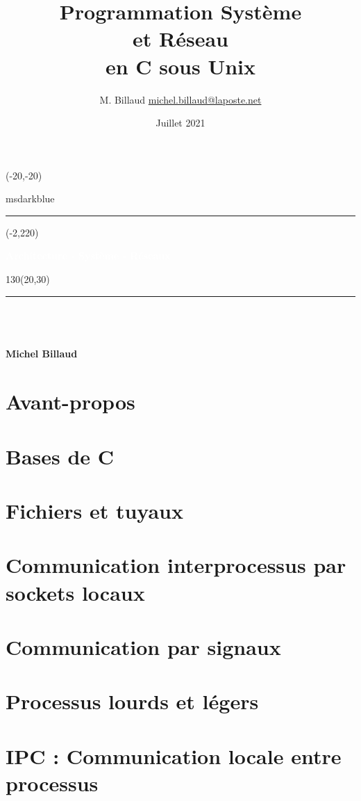 \documentclass[10pt,twoside,a4paper,openright]{extreport}
\title{
  Programmation Système \\
  et Réseau \\ en C sous Unix
}
\author{M. Billaud \url{michel.billaud@laposte.net}}
\date{Juillet 2021}
\renewcommand{\maketitle}{

\begin{titlepage}
\setlength{\TPHorizModule}{1mm}
\setlength{\TPVertModule}{1mm}
 
 \begin{textblock}{50}(-20,-20)
  \begin{color}{msdarkblue}
    \rule{3cm}{25.5cm}    
  \end{color}
\end{textblock}

\begin{textblock}{20}(-2,220)
\begin{rotate}{90}
{\huge\bfseries\textcolor{white}{Architecture - Système - Réseaux}}
\end{rotate}
\end{textblock}
 
 \begin{textblock}{130}(20,30)
 {\noindent\rule{2cm}{2cm}}
 \\[5em]

{
\noindent\Huge\bf \noindent \thetitle } \\[5em]
 
{\noindent\Large\bfseries\sf \thedate} \\[10em]

{\noindent\Large\bfseries\sf Michel Billaud}

 \end{textblock}
\end{titlepage}
\makeatother

\clearpage
}
\begin{document}
 
\sloppy
\maketitle
\begin{abstract}

\end{abstract}

\newpage 
\tableofcontents

\newpage

\chapter*{Avant-propos}



\newpage


\chapter{Bases de C}



\chapter{Fichiers et tuyaux}





\chapter{Communication interprocessus par sockets locaux}




\chapter{Communication par signaux}



\chapter{Processus lourds et légers}




\chapter{IPC : Communication locale entre processus}


\end{document}
